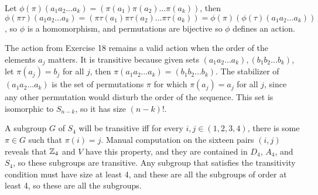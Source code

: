 \documentclass[11pt, oneside]{article}   	%
\begin{document}
\item Let $\phi(\pi)(a_1a_2\ldots a_k) = (\pi(a_1)\pi(a_2)\ldots\pi(a_k))$, then $\phi(\pi\tau)(a_1a_2\ldots a_k) = (\pi\tau(a_1)\pi\tau(a_2)\ldots \pi\tau(a_k)) = \phi(\pi)(\phi(\tau)(a_1 a_2 \ldots a_k))$, so $\phi$ is a homomorphism, and permutations are bijective so $\phi$ defines an action.
\item The action from Exercise 18 remains a valid action when the order of the elements $a_j$ matters. It is transitive because given sets $(a_1a_2\ldots a_k), (b_1 b_2 \ldots b_k)$, let $\pi(a_j) = b_j$ for all $j$, then $\pi(a_1a_2\ldots a_k) = (b_1 b_2 \ldots b_k)$. The stabilizer of $(a_1a_2\ldots a_k)$ is the set of permutations $\pi$ for which $\pi(a_j) = a_j$ for all $j$, since any other permutation would disturb the order of the sequence. This set is isomorphic to $S_{n-k}$, so it has size $(n-k)!$. 
\item A subgroup $G$ of $S_4$ will be transitive iff for every $i, j \in (1, 2, 3, 4)$, there is some $\pi \in G$ such that $\pi(i) = j$. Manual computation on the sixteen pairs $(i, j)$ reveals that $\mathbb{Z}_4$ and $V$ have this property, and they are contained in $D_4$, $A_4$, and $S_4$, so these subgroups are transitive. Any subgroup that satisfies the transitivity condition must have size at least 4, and these are all the subgroups of order at least 4, so these are all the subgroups. 
\ee
\end{document}
